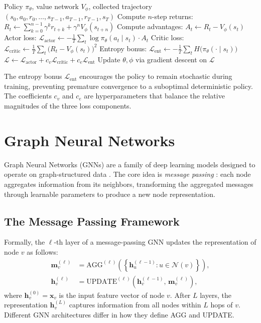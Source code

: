 \documentclass[11pt,a4paper,twoside]{tesis}
\begin{document}
\begin{algorithm}[H]
\caption{A2C update (one iteration)}
\label{alg:a2c}
\begin{algorithmic}[1]
\Require Policy $\pi_\theta$, value network $V_\phi$, collected trajectory
         $(s_0,a_0,r_0,\ldots,s_{T-1},a_{T-1},r_{T-1},s_T)$
\State Compute $n$-step returns: $R_t \leftarrow \sum_{k=0}^{n-1}\gamma^k r_{t+k} + \gamma^n V_\phi(s_{t+n})$
\State Compute advantages: $A_t \leftarrow R_t - V_\phi(s_t)$
\State Actor loss: $\mathcal{L}_{\mathrm{actor}} \leftarrow -\frac{1}{T}\sum_t \log\pi_\theta(a_t\mid s_t)\cdot A_t$
\State Critic loss: $\mathcal{L}_{\mathrm{critic}} \leftarrow \frac{1}{T}\sum_t \bigl(R_t - V_\phi(s_t)\bigr)^2$
\State Entropy bonus: $\mathcal{L}_{\mathrm{ent}} \leftarrow -\frac{1}{T}\sum_t H\bigl(\pi_\theta(\cdot\mid s_t)\bigr)$
\State $\mathcal{L} \leftarrow \mathcal{L}_{\mathrm{actor}} + c_v\mathcal{L}_{\mathrm{critic}} + c_e\mathcal{L}_{\mathrm{ent}}$
\State Update $\theta,\phi$ via gradient descent on $\mathcal{L}$
\end{algorithmic}
\end{algorithm}

The entropy bonus $\mathcal{L}_{\mathrm{ent}}$ encourages the policy to remain
stochastic during training, preventing premature convergence to a suboptimal deterministic
policy. The coefficients $c_v$ and $c_e$ are hyperparameters that balance the relative
magnitudes of the three loss components.

\section{Graph Neural Networks}
\label{sec:gnn}

Graph Neural Networks (GNNs) are a family of deep learning models designed to operate
on graph-structured data \cite{scarselli2009gnn}. The core idea is \emph{message
passing} \cite{gilmer2017mpnn}: each node aggregates information from its neighbors,
transforming the aggregated messages through learnable parameters to produce a new node
representation.

\subsection{The Message Passing Framework}

Formally, the $\ell$-th layer of a message-passing GNN updates the representation of
node $v$ as follows:
\begin{align}
\mathbf{m}_v^{(\ell)} &= \mathrm{AGG}^{(\ell)}\!\left(\left\{
    \mathbf{h}_u^{(\ell-1)} : u \in \mathcal{N}(v)\right\}\right),
    \label{eq:agg} \\
\mathbf{h}_v^{(\ell)} &= \mathrm{UPDATE}^{(\ell)}\!\left(
    \mathbf{h}_v^{(\ell-1)},\, \mathbf{m}_v^{(\ell)}\right),
    \label{eq:update}
\end{align}
where $\mathbf{h}_v^{(0)} = \mathbf{x}_v$ is the input feature vector of node $v$.
After $L$ layers, the representation $\mathbf{h}_v^{(L)}$ captures information from all
nodes within $L$ hops of $v$. Different GNN architectures differ in how they define
AGG and UPDATE.
\end{document}
